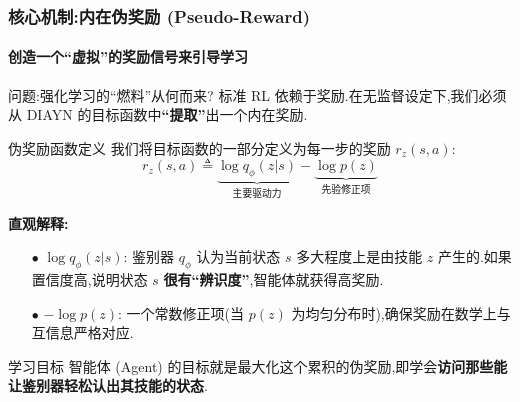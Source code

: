 \documentclass{beamer}
\begin{document}
\begin{frame}
    \frametitle{核心机制:内在伪奖励 (Pseudo-Reward)}
    \framesubtitle{创造一个“虚拟”的奖励信号来引导学习}

    \begin{block}{问题:强化学习的“燃料”从何而来?}
        标准 RL 依赖于奖励.在无监督设定下,我们必须从 DIAYN 的目标函数中\textbf{“提取”}出一个内在奖励.
    \end{block}

    \begin{exampleblock}{伪奖励函数定义}
        我们将目标函数的一部分定义为每一步的奖励 $r_z(s, a)$:
        \[
            r_z(s, a) \triangleq \underbrace{\log q_\phi(z | s)}_{\text{主要驱动力}} - \underbrace{\log p(z)}_{\text{先验修正项}}
        \]
        
        \textbf{直观解释:}
        \begin{itemize}
            \item[$\bullet$] $\log q_\phi(z|s)$: 鉴别器 $q_\phi$ 认为当前状态 $s$ 多大程度上是由技能 $z$ 产生的.如果置信度高,说明状态 $s$ \textbf{很有“辨识度”},智能体就获得高奖励.
            \item[$\bullet$] $-\log p(z)$: 一个常数修正项(当 $p(z)$ 为均匀分布时),确保奖励在数学上与互信息严格对应.
        \end{itemize}
    \end{exampleblock}

    \begin{alertblock}{学习目标}
        智能体 (Agent) 的目标就是最大化这个累积的伪奖励,即学会\textbf{访问那些能让鉴别器轻松认出其技能的状态}.
    \end{alertblock}

\end{frame}
\end{document}
